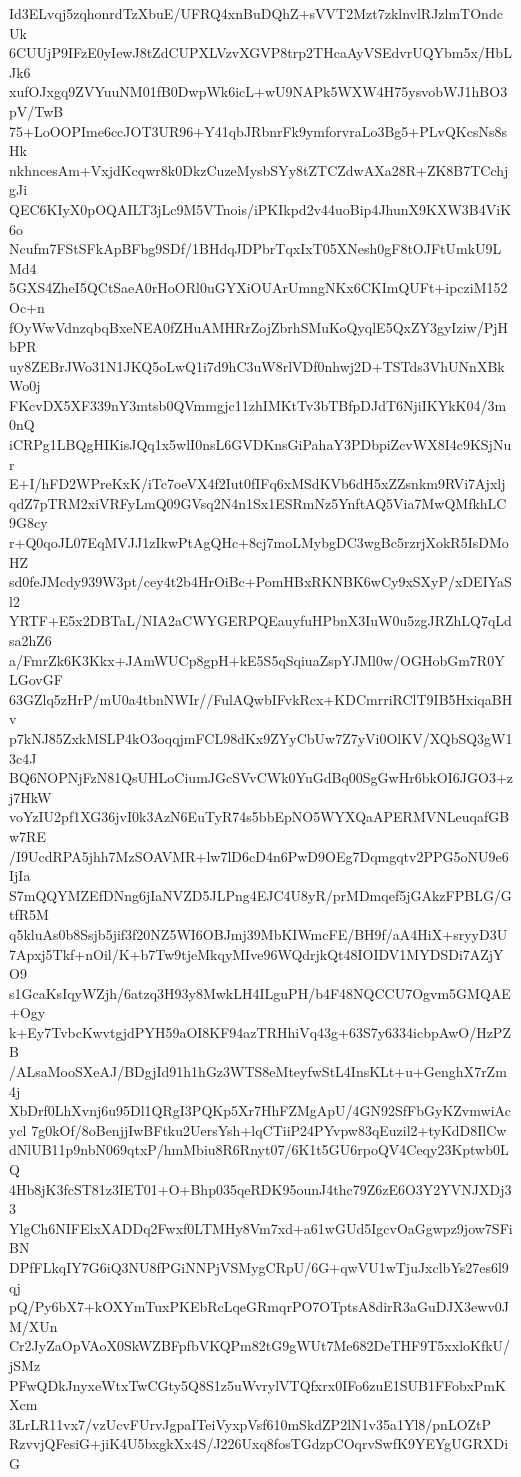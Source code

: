 Id3ELvqj5zqhonrdTzXbuE/UFRQ4xnBuDQhZ+sVVT2Mzt7zklnvlRJzlmTOndcUk
6CUUjP9IFzE0yIewJ8tZdCUPXLVzvXGVP8trp2THcaAyVSEdvrUQYbm5x/HbLJk6
xufOJxgq9ZVYuuNM01fB0DwpWk6icL+wU9NAPk5WXW4H75ysvobWJ1hBO3pV/TwB
75+LoOOPIme6ccJOT3UR96+Y41qbJRbnrFk9ymforvraLo3Bg5+PLvQKcsNs8sHk
nkhncesAm+VxjdKcqwr8k0DkzCuzeMysbSYy8tZTCZdwAXa28R+ZK8B7TCchjgJi
QEC6KIyX0pOQAILT3jLc9M5VTnois/iPKIkpd2v44uoBip4JhunX9KXW3B4ViK6o
Ncufm7FStSFkApBFbg9SDf/1BHdqJDPbrTqxIxT05XNesh0gF8tOJFtUmkU9LMd4
5GXS4ZheI5QCtSaeA0rHoORl0uGYXiOUArUmngNKx6CKImQUFt+ipcziM152Oc+n
fOyWwVdnzqbqBxeNEA0fZHuAMHRrZojZbrhSMuKoQyqlE5QxZY3gyIziw/PjHbPR
uy8ZEBrJWo31N1JKQ5oLwQ1i7d9hC3uW8rlVDf0nhwj2D+TSTds3VhUNnXBkWo0j
FKcvDX5XF339nY3mtsb0QVmmgjc11zhIMKtTv3bTBfpDJdT6NjiIKYkK04/3m0nQ
iCRPg1LBQgHIKisJQq1x5wlI0nsL6GVDKnsGiPahaY3PDbpiZcvWX8I4c9KSjNur
E+I/hFD2WPreKxK/iTc7oeVX4f2Iut0fIFq6xMSdKVb6dH5xZZsnkm9RVi7Ajxlj
qdZ7pTRM2xiVRFyLmQ09GVsq2N4n1Sx1ESRmNz5YnftAQ5Via7MwQMfkhLC9G8cy
r+Q0qoJL07EqMVJJ1zIkwPtAgQHc+8cj7moLMybgDC3wgBc5rzrjXokR5IsDMoHZ
sd0feJMcdy939W3pt/cey4t2b4HrOiBc+PomHBxRKNBK6wCy9xSXyP/xDEIYaSl2
YRTF+E5x2DBTaL/NIA2aCWYGERPQEauyfuHPbnX3IuW0u5zgJRZhLQ7qLdsa2hZ6
a/FmrZk6K3Kkx+JAmWUCp8gpH+kE5S5qSqiuaZspYJMl0w/OGHobGm7R0YLGovGF
63GZlq5zHrP/mU0a4tbnNWIr//FulAQwbIFvkRcx+KDCmrriRClT9IB5HxiqaBHv
p7kNJ85ZxkMSLP4kO3oqqjmFCL98dKx9ZYyCbUw7Z7yVi0OlKV/XQbSQ3gW13c4J
BQ6NOPNjFzN81QsUHLoCiumJGcSVvCWk0YuGdBq00SgGwHr6bkOI6JGO3+zj7HkW
voYzIU2pf1XG36jvI0k3AzN6EuTyR74s5bbEpNO5WYXQaAPERMVNLeuqafGBw7RE
/I9UcdRPA5jhh7MzSOAVMR+lw7lD6cD4n6PwD9OEg7Dqmgqtv2PPG5oNU9e6IjIa
S7mQQYMZEfDNng6jIaNVZD5JLPng4EJC4U8yR/prMDmqef5jGAkzFPBLG/GtfR5M
q5kluAs0b8Ssjb5jif3f20NZ5WI6OBJmj39MbKIWmcFE/BH9f/aA4HiX+sryyD3U
7Apxj5Tkf+nOil/K+b7Tw9tjeMkqyMIve96WQdrjkQt48IOIDV1MYDSDi7AZjYO9
s1GcaKsIqyWZjh/6atzq3H93y8MwkLH4ILguPH/b4F48NQCCU7Ogvm5GMQAE+Ogy
k+Ey7TvbcKwvtgjdPYH59aOI8KF94azTRHhiVq43g+63S7y6334icbpAwO/HzPZB
/ALsaMooSXeAJ/BDgjId91h1hGz3WTS8eMteyfwStL4InsKLt+u+GenghX7rZm4j
XbDrf0LhXvnj6u95Dl1QRgI3PQKp5Xr7HhFZMgApU/4GN92SfFbGyKZvmwiAcycl
7g0kOf/8oBenjjIwBFtku2UersYsh+lqCTiiP24PYvpw83qEuzil2+tyKdD8IlCw
dNlUB11p9nbN069qtxP/hmMbiu8R6Rnyt07/6K1t5GU6rpoQV4Ceqy23Kptwb0LQ
4Hb8jK3fcST81z3IET01+O+Bhp035qeRDK95ounJ4thc79Z6zE6O3Y2YVNJXDj33
YlgCh6NIFElxXADDq2Fwxf0LTMHy8Vm7xd+a61wGUd5IgcvOaGgwpz9jow7SFiBN
DPfFLkqIY7G6iQ3NU8fPGiNNPjVSMygCRpU/6G+qwVU1wTjuJxclbYs27es6l9qj
pQ/Py6bX7+kOXYmTuxPKEbRcLqeGRmqrPO7OTptsA8dirR3aGuDJX3ewv0JM/XUn
Cr2JyZaOpVAoX0SkWZBFpfbVKQPm82tG9gWUt7Me682DeTHF9T5xxloKfkU/jSMz
PFwQDkJnyxeWtxTwCGty5Q8S1z5uWvrylVTQfxrx0IFo6zuE1SUB1FFobxPmKXcm
3LrLR11vx7/vzUcvFUrvJgpaITeiVyxpVsf610mSkdZP2lN1v35a1Yl8/pnLOZtP
RzvvjQFesiG+jiK4U5bxgkXx4S/J226Uxq8fosTGdzpCOqrvSwfK9YEYgUGRXDiG
